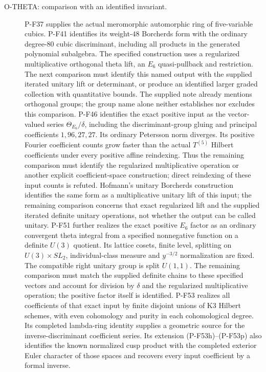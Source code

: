 \begin{description}
\item[O-THETA: comparison with an identified invariant.]
P-F37 supplies the actual meromorphic automorphic ring of
five-variable cubics. P-F41 identifies its weight-$48$
Borcherds form with the ordinary degree-$80$ cubic discriminant,
including all products in the generated polynomial subalgebra.
The specified construction uses a regularized multiplicative
orthogonal theta lift, an $E_6$ quasi-pullback and restriction.
The next comparison must identify this named output with the
supplied iterated unitary lift or determinant, or produce an
identified larger graded collection with quantitative bounds.
The supplied note already mentions orthogonal groups; the group
name alone neither establishes nor excludes this comparison.
P-F46 identifies the exact positive input as the vector-valued
series $\Theta_{E_6}/\delta$, including the discriminant-group
gluing and principal coefficients $1,96,27,27$. Its ordinary
Petersson norm diverges. Its positive Fourier coefficient counts
grow faster than the actual $T^{(5)}$ Hilbert coefficients under
every positive affine reindexing. Thus the remaining comparison
must identify the regularized multiplicative operation or another
explicit coefficient-space construction; direct reindexing of
these input counts is refuted. Hofmann's unitary Borcherds
construction identifies the same form as a multiplicative
unitary lift of this input; the remaining comparison concerns
that exact regularized lift and the supplied iterated definite
unitary operations, not whether the output can be called unitary.
P-F51 further realizes the exact positive $E_6$ factor as an
ordinary convergent theta integral from a specified nonnegative
function on a definite $U(3)$ quotient. Its lattice cosets,
finite level, splitting on $U(3)\times SL_2$, individual-class
measure and $y^{-3/2}$ normalization are fixed. The compatible
right unitary group is split $U(1,1)$. The remaining comparison
must match the supplied definite chains to these specified
vectors and account for division by $\delta$ and the regularized
multiplicative operation; the positive factor itself is identified.
P-F53 realizes all coefficients of that exact input by finite
disjoint unions of K3 Hilbert schemes, with even cohomology
and purity in each cohomological degree. Its completed
lambda-ring identity supplies a geometric source for the
inverse-discriminant coefficient series. Its extension
(P-F53h)--(P-F53p) also identifies the known normalized cusp
product with the completed exterior Euler character of those
spaces and recovers every input coefficient by a formal inverse.

\end{description}
